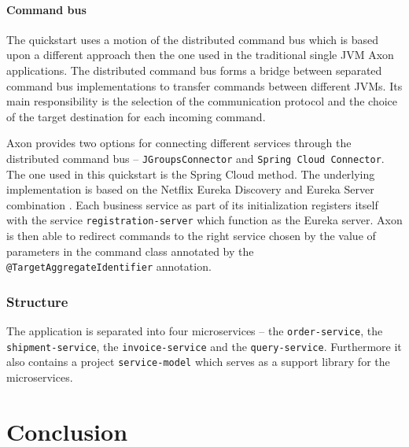 \documentclass[oneside,
  digital, %
  table,   %
  nolof,     %
  nolot,     %
]{fithesis3}
\begin{document}
\subsubsection{Command bus}

The quickstart uses a motion of the distributed command bus which is based upon a different approach then the one used in the traditional single JVM Axon applications. The distributed command bus forms a bridge between separated command bus implementations to transfer commands between different JVMs\cite{axon_framework_reference_guide}. Its main responsibility is the selection of the communication protocol and the choice of the target destination for each incoming command. 

Axon provides two options for connecting different services through the distributed command bus -- \texttt{JGroupsConnector} and \texttt{Spring Cloud Connector}. The one used in this quickstart is the Spring Cloud method. The underlying implementation is based on the Netflix Eureka Discovery and Eureka Server combination \cite{service_registration}. Each business service as part of its initialization registers itself with the service \texttt{registration-server} which function as the Eureka server. Axon is then able to redirect commands to the right service chosen by the value of parameters in the command class annotated by the \texttt{@TargetAggregateIdentifier} annotation.



\subsection{Structure}

The application is separated into four microservices -- the \newline \texttt{order-service}, the \texttt{shipment-service}, the \texttt{invoice-service} and the \texttt{query-service}. Furthermore it also contains a project \texttt{service-model} which serves as a support library for the microservices.



\clearpage
\chapter{Conclusion}



\makeatletter\thesis@blocks@clear\makeatother
{} %
\printindex
\end{document}
